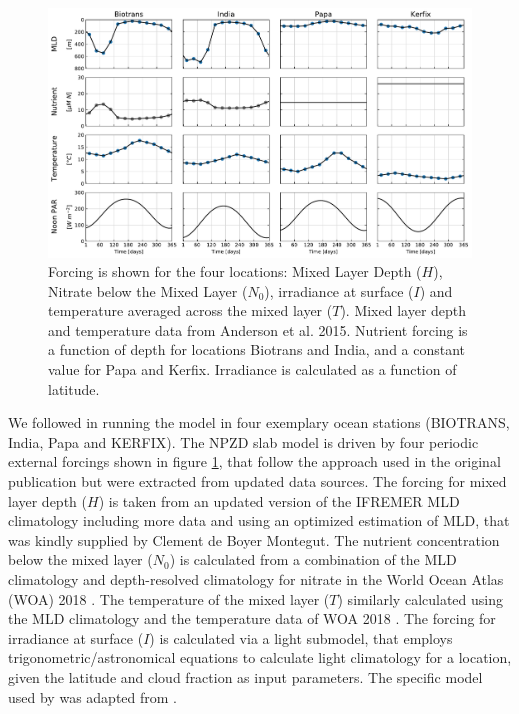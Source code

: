 \documentclass[journal abbreviation, manuscript]{copernicus}
\begin{document}
\begin{figure}[t]
\includegraphics[width=15cm]{Figures/firstdraft_plots/02_EMPOWER_forcing.pdf}
\caption{Forcing is shown for the four locations: Mixed Layer Depth ($H$), Nitrate below the Mixed Layer ($N_0$), irradiance at surface ($I$) and temperature averaged across the mixed layer ($T$). Mixed layer depth and temperature data from Anderson et al. 2015. Nutrient forcing is a function of depth for locations Biotrans and India, and a constant value for Papa and Kerfix. Irradiance is calculated as a function of latitude.}
\label{Figure:EMPOWERforcing}
\end{figure}

We followed \citet{Anderson2015c} in running the model in four exemplary ocean stations (BIOTRANS, India, Papa and KERFIX). The NPZD slab model is driven by four periodic external forcings shown in figure \ref{Figure:EMPOWERforcing}, that follow the approach used in the original publication but were extracted from updated data sources. 
The forcing for mixed layer depth ($H$) is taken from an updated version of the IFREMER MLD climatology  \citep{DeBoyerMontegut2004} including more data and using an optimized estimation of MLD, that was kindly supplied by Clement de Boyer Montegut.
The nutrient concentration below the mixed layer ($N_0$) is calculated from a combination of the MLD climatology and depth-resolved climatology for nitrate in the World Ocean Atlas (WOA) 2018 \citep{Garcia2019WORLDSilicate}. The temperature of the mixed layer ($T$) similarly calculated using the MLD climatology and the temperature data of WOA 2018 \citep{Locarnini2019WorldTemperature}.
The forcing for irradiance at surface ($I$) is calculated via a light submodel, that employs trigonometric/astronomical equations to calculate light climatology for a location, given the latitude and cloud fraction as input parameters. The specific model used by \citet{Anderson2015c} was adapted from \citet{Shine1984ParametrizationAlbedo}.
\end{document}
